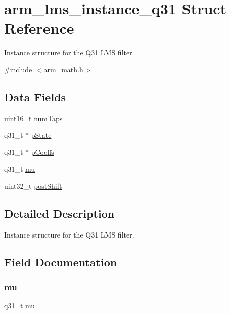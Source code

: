 \hypertarget{structarm__lms__instance__q31}{}\section{arm\+\_\+lms\+\_\+instance\+\_\+q31 Struct Reference}
\label{structarm__lms__instance__q31}


Instance structure for the Q31 L\+MS filter.  




{\ttfamily \#include $<$arm\+\_\+math.\+h$>$}

\subsection*{Data Fields}
\begin{DoxyCompactItemize}
\item 
uint16\+\_\+t \mbox{\hyperlink{structarm__lms__instance__q31_a751941891e47f522a7f5375fe8990aac}{num\+Taps}}
\item 
q31\+\_\+t $\ast$ \mbox{\hyperlink{structarm__lms__instance__q31_adee4ba3ee8869865af7d8fa08ca913d6}{p\+State}}
\item 
q31\+\_\+t $\ast$ \mbox{\hyperlink{structarm__lms__instance__q31_a68888e36167d81cb7836db10367a1682}{p\+Coeffs}}
\item 
q31\+\_\+t \mbox{\hyperlink{structarm__lms__instance__q31_a21ab4237a726ea7751f5026d89d2e577}{mu}}
\item 
uint32\+\_\+t \mbox{\hyperlink{structarm__lms__instance__q31_aa2cacddfc5e1d86905d7d31a18b1979b}{post\+Shift}}
\end{DoxyCompactItemize}


\subsection{Detailed Description}
Instance structure for the Q31 L\+MS filter. 

\subsection{Field Documentation}
\mbox{\label{structarm__lms__instance__q31_a21ab4237a726ea7751f5026d89d2e577}} 
\subsubsection{\texorpdfstring{mu}{mu}}
{\footnotesize\ttfamily q31\+\_\+t mu}

